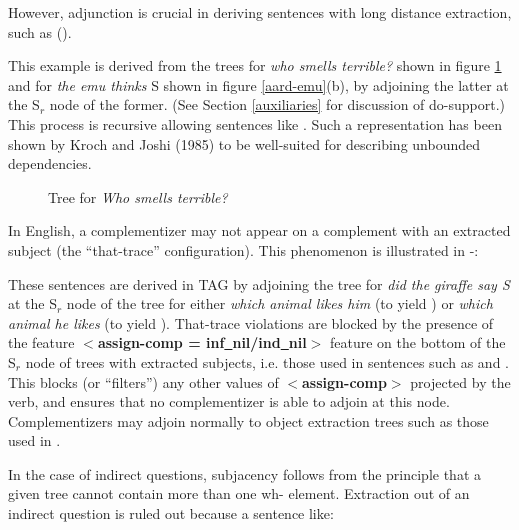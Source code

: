 However, adjunction is crucial in deriving sentences with
long distance extraction, such as ().  


This example is derived from the trees for {\it who smells terrible?}
shown in figure \ref{who-smells} and for {\it the emu thinks} S shown
in figure \ref{aard-emu}(b), by adjoining the latter at the S$_r$ node of
the former. (See Section \ref{auxiliaries} for discussion of do-support.) This process is recursive allowing sentences like
. Such a representation has been shown by Kroch and Joshi
(1985)\nocite{kj85} to be well-suited for describing unbounded dependencies.

\begin{figure}[t]
\centering
\hspace{0.0in}
\caption{Tree for {\it Who smells terrible?}}
\label{who-smells}
\end{figure}

In English, a complementizer may not appear on a complement with an extracted
subject (the ``that-trace'' configuration). This phenomenon
is illustrated in -:


These sentences are derived in TAG by
adjoining the tree for {\it did the giraffe say S} at the S$_r$ node
of the tree for either {\it which animal likes him} (to yield )
or {\it which animal he likes} (to yield ).  That-trace
violations are blocked by the presence of the feature {\bf $<$assign-comp
= inf\underline{~}nil/ind\underline{~}nil$>$} feature on the bottom of
the S$_r$ node of trees with extracted subjects, i.e. those used in
sentences such as  and .  This blocks (or ``filters'') any
other values of {\bf $<$assign-comp$>$} projected by the verb, and ensures
that no complementizer is able to adjoin at this node.
Complementizers may adjoin normally to object extraction trees such as
those used in .

In the case of indirect questions, subjacency follows from the
principle that a given tree cannot contain more than one
wh- element. Extraction out of an indirect question is ruled out
because a sentence like:

